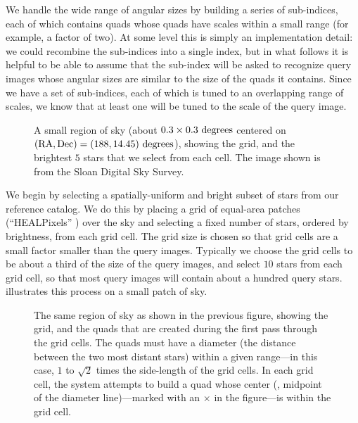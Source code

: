 We handle the wide range of angular sizes by building a series of
sub-indices, each of which contains quads whose quads have scales
within a small range (for example, a factor of two).  At some level
this is simply an implementation detail: we could recombine the
sub-indices into a single index, but in what follows it is helpful to
be able to assume that the sub-index will be asked to recognize query
images whose angular sizes are similar to the size of the quads it
contains.  Since we have a set of sub-indices, each of which is tuned
to an overlapping range of scales, we know that at least one will be
tuned to the scale of the query image.

\begin{figure}[htp]
\begin{center}
\setlength{\fboxsep}{0.5pt}
\end{center}
\caption{A small region of sky (about $0.3\times0.3~\mathrm{degrees}$ centered on
$(\mathrm{RA}, \mathrm{Dec}) = (188, 14.45)~\mathrm{degrees}$), showing the \healpix grid, and the
brightest $5$ stars that we select from each cell.  The image
shown is from the Sloan Digital Sky Survey.
\label{fig:cut}}
\end{figure}

We begin by selecting a spatially-uniform and bright subset of stars
from our reference catalog.  We do this by placing a grid of
equal-area patches (``HEALPixels'' \cite{healpix}) over the sky and
selecting a fixed number of stars, ordered by brightness, from each
grid cell.  The grid size is chosen so that grid cells are a small
factor smaller than the query images.  Typically we choose the grid
cells to be about a third of the size of the query images, and select
$10$ stars from each grid cell, so that most query images will contain
about a hundred query stars.   illustrates this
process on a small patch of sky.


\begin{figure}[htp]
\begin{center}
\setlength{\fboxsep}{0.5pt}
\end{center}
\caption{The same region of sky as shown in the previous figure, showing the
\healpix grid, and the quads that are created during the first pass through
the grid cells.  The quads must have a diameter (the distance between
the two most distant stars) within a given range---in this case, $1$
to $\sqrt{2}$ times the side-length of the grid cells.  In each grid
cell, the system attempts to build a quad whose center (\ie, midpoint
of the diameter line)---marked with an $\mathbf{\times}$ in the
figure---is within the grid cell.
\label{fig:quad1}}
\end{figure}

